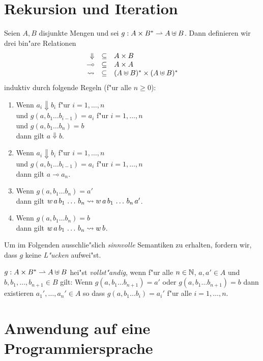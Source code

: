\documentclass[12pt,a4paper,draft]{article}
\begin{document}
\section{Rekursion und Iteration}

Seien $A,B$ disjunkte Mengen und sei $g: A \times B^* \rightharpoonup A \uplus B$. Dann definieren wir
drei bin"are Relationen
\[\begin{array}{rcl}
  \Downarrow & \subseteq & A \times B \\
  \multimap  & \subseteq & A \times A \\
  \rightsquigarrow      & \subseteq & (A \uplus B)^* \times (A \uplus B)^*
\end{array}\]
induktiv durch folgende Regeln (f"ur alle $n \ge 0$):
\begin{enumerate}
\item Wenn $a_i \Downarrow b_i$ f"ur $i=1,\ldots,n$ \\
  und $g(a,b_1 \ldots b_{i-1}) = a_i$ f"ur $i = 1,\ldots,n$ \\
  und $g(a,b_1 \ldots b_n) = b$ \\
  dann gilt $a \Downarrow b$.
\item Wenn $a_i \Downarrow b_i$ f"ur $i=1,\ldots,n$ \\
  und $g(a,b_1 \ldots b_{i-1})=a_i$ f"ur $i=1,\ldots,n$ \\
  dann gilt $a \multimap a_n$.
\item Wenn $g(a,b_1 \ldots b_n) = a'$ \\
  dann gilt $w\,a\,b_1\,\ldots\,b_n \rightsquigarrow w\,a\,b_1\,\ldots\,b_n\,a'$.
\item Wenn $g(a,b_1 \ldots b_n) = b$ \\
  dann gilt $w\,a\,b_1\,\ldots\,b_n \rightsquigarrow w\,b$.
\end{enumerate}
Um im Folgenden ausschlie"slich \emph{sinnvolle} Semantiken zu erhalten, fordern wir, dass $g$
keine \emph{L"ucken} aufwei"st.
\begin{definition}
  $g: A \times B^* \rightharpoonup A \uplus B$ hei"st \emph{vollst"andig}, wenn f"ur alle $n \in \mathbb N$, $a,a'\in A$
  und $b,b_1,\ldots,b_{n+1} \in B$ gilt: 
  Wenn $g(a,b_1 \ldots b_{n+1}) = a'$ oder $g(a,b_1 \ldots b_{n+1}) = b$ dann
  existieren $a_1',\ldots,a_n' \in A$ so dass $g(a,b_1 \ldots b_i) = a_i'$ f"ur alle $i = 1,\ldots,n$.
\end{definition}


\section{Anwendung auf eine Programmiersprache}
\end{document}
